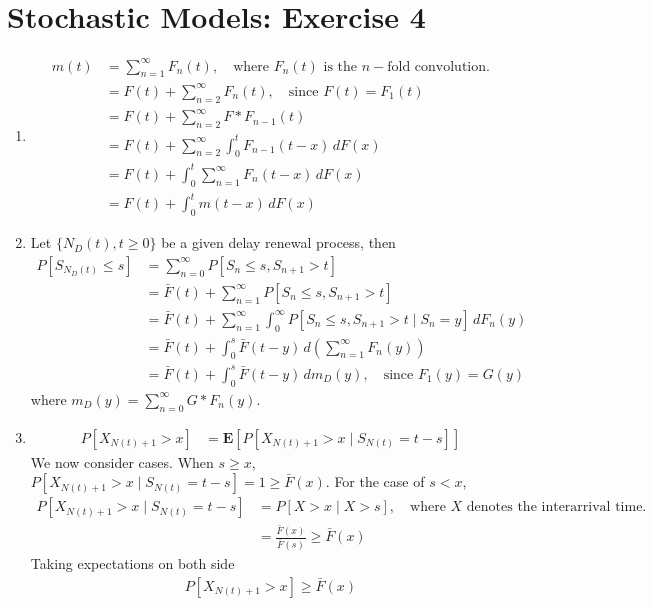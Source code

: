 \documentclass[a4paper,10pt]{article}
\theoremstyle{definition}
\begin{document}
\section*{Stochastic Models: Exercise 4}

\begin{enumerate}
\item 
\begin{align*}
m(t) &= \sum_{n=1}^{\infty}F_n(t),\quad \text{where $F_n(t)$ is the $n-$fold convolution.}\\
&=F(t) + \sum_{n=2}^{\infty}F_n(t) ,\quad\text{since $F(t)=F_1(t)$}\\
&=F(t)+\sum_{n=2}^{\infty} F \ast F_{n-1}(t)\\
&=F(t)+\sum_{n=2}^{\infty} \int_{0}^{t} F_{n-1}(t-x)\,dF(x)\\
&=F(t)+\int_{0}^{t} \sum_{n=1}^{\infty} F_{n}(t-x)\,dF(x)\\
&=F(t)+\int_{0}^{t} m(t-x)\,dF(x)
\end{align*}

\item Let $\{N_D(t), t \geq 0\}$ be a given delay renewal process, then
\begin{align*}
P\left[S_{N_D(t)}\leq s\right] &=\sum_{n=0}^{\infty}P\left[S_{n}\leq s, S_{n+1}>t\right]\\
&=\bar{F}(t)+\sum_{n=1}^{\infty}P\left[S_{n}\leq s, S_{n+1}>t\right]\\
&=\bar{F}(t)+\sum_{n=1}^{\infty}\int_{0}^{\infty}P\left[S_{n}\leq s, S_{n+1}>t\mid S_n=y\right]\,dF_n(y)\\
&=\bar{F}(t)+\int_{0}^{s}\bar{F}(t-y)\,d\left(\sum_{n=1}^{\infty}F_n(y)\right)\\
&=\bar{F}(t)+\int_{0}^{s}\bar{F}(t-y)\,dm_D(y),\quad \text{since $F_1(y)=G(y)$}
\end{align*}
where $m_D(y)=\sum_{n=0}^{\infty}G \ast F_{n}(y)$.

\item
\begin{align*}
P\left[X_{N(t)+1}>x\right]&=\mathbf{E}\left[P\left[X_{N(t)+1}>x\mid S_{N(t)}=t-s\right]\right]
\end{align*}
We now consider cases. When $s\geq x$, $P\left[X_{N(t)+1}>x\mid S_{N(t)}=t-s\right]=1 \geq \bar{F}(x)$. For the case of $s < x$,
\begin{align*}
P\left[X_{N(t)+1}>x\mid S_{N(t)}=t-s\right]&=P\left[X>x\mid X > s\right], \quad \text{where $X$ denotes the interarrival time.}\\
&=\frac{\bar{F}(x)}{\bar{F}(s)}\geq \bar{F}(x)
\end{align*}
Taking expectations on both side
\begin{align*}
P\left[X_{N(t)+1}>x\right] \geq \bar{F}(x)
\end{align*}


\end{enumerate}
\end{document}
